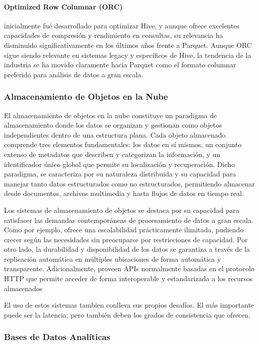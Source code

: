 \paragraph{Optimized Row Columnar (ORC)} 
inicialmente fué desarrollado para optimizar Hive, 
y aunque ofrece excelentes capacidades de compresión y rendimiento en consultas, su relevancia 
ha disminuido significativamente en los últimos años frente a Parquet. Aunque ORC sigue siendo 
relevante en sistemas legacy y específicos de Hive, la tendencia de la industria se ha movido 
claramente hacia Parquet como el formato columnar preferido para análisis de datos a gran escala.

\subsubsection{Almacenamiento de Objetos en la Nube}

El almacenamiento de objetos en la nube constituye un paradigma de almacenamiento donde los datos se organizan y gestionan como objetos independientes dentro de una estructura plana.
Cada objeto almacenado comprende tres elementos fundamentales: los datos en sí mismos, un conjunto extenso de metadatos que describen y categorizan la información, 
y un identificador único global que permite su localización y recuperación. 
Dicho paradigma, se caracteriza por su naturaleza distribuida y su capacidad para manejar tanto datos estructurados como no estructurados, 
permitiendo almacenar desde documentos, archivos multimedia y hasta flujos de datos en tiempo real.

Los sistemas de almacenamiento de objetos se destaca por su capacidad para satisfacer las demandas contemporáneas de procesamiento de datos a gran escala.
Como por ejemplo, ofrece una escalabilidad prácticamente ilimitada, pudiendo crecer según las necesidades sin preocuparse por restricciones de capacidad.
Por otro lado, la durabilidad y disponibilidad de los datos se garantiza a través de la replicación automática en múltiples ubicaciones de forma automática y transparente.
Adicionalmente, proveen APIs normalmente basadas en el protocolo HTTP que permite acceder de forma interoperable y estandarizada a los recursos almacenados

El uso de estos sistemas tambien conlleva sus propios desafíos. El más importante puede ser la latencia; pero también deben los grados de consistencia que ofrecen.

\subsubsection{Bases de Datos Analíticas}


